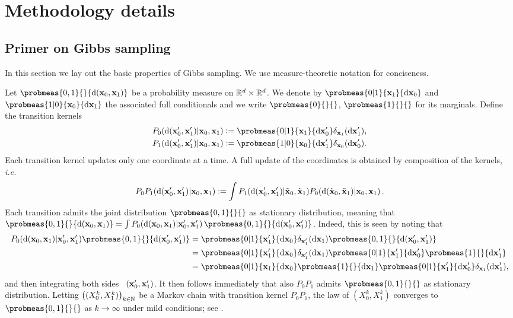 \section{Methodology details}
\subsection{Primer on Gibbs sampling}
\label{apdx-sec:gibbs}
In this section we lay out the basic properties of Gibbs sampling. We use measure-theoretic notation for conciseness. 

Let $\probmeas{0,1}{}{\rmd (\bx_0, \bx_1)}$ be a probability measure on $\mathbb{R}^{d} \times \mathbb{R}^{d}$. We denote by $\probmeas{0|1}{\bx_1}{\rmd \bx_0}$ and $\probmeas{1|0}{\bx_0}{\rmd \bx_1}$ the associated full conditionals and we write $\probmeas{0}{}{}$, $\probmeas{1}{}{}$ for its marginals. Define the %
transition kernels 
\begin{align*} 
    P_0(\rmd (\bx^\prime _0, \bx^\prime _1) | \bx_0, \bx_1) & \eqdef \probmeas{0|1}{\bx_1}{\rmd \bx^\prime _0} \delta_{\bx_1}(\rmd \bx^\prime _1),\\
    P_1(\rmd (\bx^\prime _0, \bx^\prime _1) | \bx_0, \bx_1) & \eqdef \probmeas{1|0}{\bx_0}{\rmd \bx^\prime _1} \delta_{\bx_0}(\rmd \bx^\prime _0).
\end{align*}
Each transition kernel updates only one coordinate at a time. A full update of the coordinates is obtained by composition of the kernels, \emph{i.e.}
$$ 
    P_0 P_1(\mathrm{d} (\mathbf{x}^\prime _0, \mathbf{x}^\prime _1) | \mathbf{x}_0, \mathbf{x}_1) \vcentcolon= \int P_1(\mathrm{d} (\mathbf{x}^\prime _0, \mathbf{x}^\prime _1) | \tilde{\mathbf{x}}_0, \tilde{\mathbf{x}}_1) P_0(\mathrm{d} (\tilde{\mathbf{x}} _0, \tilde{\mathbf{x}} _1) | \mathbf{x}_0, \mathbf{x}_1) \,.
$$  
 Each transition admits the joint distribution $\probmeas{0, 1}{}{}$ as stationary distribution, meaning that $\probmeas{0, 1}{}{\rmd (\bx_0, \bx_1)} = \int P_0(\rmd (\bx _0, \bx _1) | \bx^\prime _0, \bx^\prime _1)\, \probmeas{0, 1}{}{\rmd (\bx^\prime _0, \bx^\prime _1)}$. Indeed, this is seen by noting that 
\begin{align*}
    P_0(\rmd (\bx _0, \bx _1) | \bx^\prime _0, \bx^\prime _1) \probmeas{0, 1}{}{\rmd (\bx^\prime _0, \bx^\prime _1)}  & =  \probmeas{0|1}{\bx^\prime _1}{\rmd \bx _0} \delta_{\bx^\prime _1}(\rmd \bx _1) \probmeas{0, 1}{}{\rmd (\bx^\prime _0, \bx^\prime _1)}\\
    & =   \probmeas{0|1}{\bx^\prime _1}{\rmd \bx _0} \delta_{\bx^\prime _1}(\rmd \bx _1) \probmeas{0|1}{\bx^\prime _1}{\rmd \bx^\prime _0} \probmeas{1}{}{\rmd \bx^\prime _1}\\ 
    & = \probmeas{0|1}{\bx _1}{\rmd \bx _0} \probmeas{1}{}{\rmd \bx _1}  \probmeas{0|1}{\bx^\prime _1}{\rmd \bx^\prime _0}\delta_{\bx _1}(\rmd \bx^\prime _1),
\end{align*}
and then integrating both sides \wrt\ $(\mathbf{x}^\prime _0, \mathbf{x}^\prime _1)$. It then follows immediately that also $P_0 P_1$ admits $\probmeas{0,1}{}{}$ as stationary distribution. Letting $\big( (X^k _0, X^k _1) \big)_{k \in \mathbb{N}}$ be a Markov chain with transition kernel $P_0 P_1$, the law of $(X^k _0, X^k _1)$ converges to $\probmeas{0,1}{}{}$ as $k \to \infty$ under mild conditions; see \cite{roberts1994simple}. 
